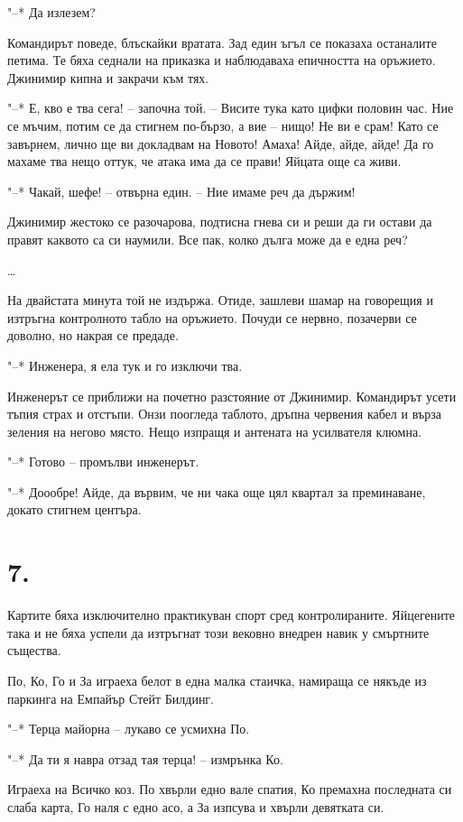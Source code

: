 \documentclass[ebook,openany,12pt]{memoir}
\begin{document}
"--* Да излезем?

Командирът поведе, блъскайки вратата. Зад един ъгъл се показаха останалите петима. Те бяха седнали на приказка и наблюдаваха епичността на оръжието. Джинимир кипна и закрачи към тях.

"--* Е, кво е тва сега! – започна той. – Висите тука като цифки половин час. Ние се мъчим, потим се да стигнем по-бързо, а вие -- нищо! Не ви е срам! Като се завърнем, лично ще ви докладвам на Новото! Амаха! Айде, айде, айде! Да го махаме тва нещо оттук, че атака има да се прави! Яйцата още са живи.

"--* Чакай, шефе! – отвърна един. – Ние имаме реч да държим!

Джинимир жестоко се разочарова, подтисна гнева си и реши да ги остави да правят каквото са си наумили. Все пак, колко дълга може да е една реч?

\ldots

На двайстата минута той не издържа. Отиде, зашлеви шамар на говорещия и изтръгна контролното табло на оръжието. Почуди се нервно, позачерви се доволно, но накрая се предаде.

"--* Инженера, я ела тук и го изключи тва.

Инженерът се приближи на почетно разстояние от Джинимир. Командирът усети тъпия страх и отстъпи. Онзи поогледа таблото, дръпна червения кабел и върза зеления на негово място. Нещо изпращя и антената на усилвателя клюмна.

"--* Готово – промълви инженерът.

"--* Доообре! Айде, да вървим, че ни чака още цял квартал за преминаване, докато стигнем центъра.

\section*{7.}

Картите бяха изключително практикуван спорт сред контролираните. Яйцегените така и не бяха успели да изтръгнат този вековно внедрен навик у смъртните същества.

По, Ко, Го и За играеха белот в една малка стаичка, намираща се някъде из паркинга на Емпайър Стейт Билдинг.

"--* Терца майорна – лукаво се усмихна По.

"--* Да ти я навра отзад тая терца! – измрънка Ко.

Играеха на Всичко коз. По хвърли едно вале спатия, Ко премахна последната си слаба карта, Го наля с едно асо, а За изпсува и хвърли девятката си.
\end{document}

